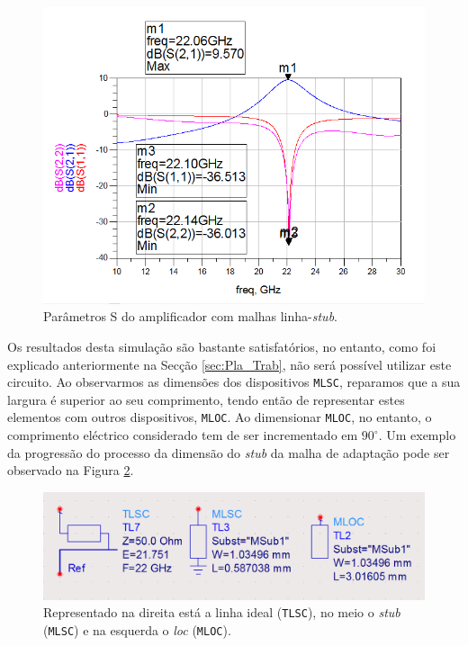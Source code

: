 \documentclass[11pt]{article}
\numberwithin{equation}{section}
\begin{document}
\begin{figure}[H]
	\centering
	\includegraphics[keepaspectratio=true, scale=0.45]{exps/mf_stub_S}
	\vspace{-0.5em}
	\caption{Parâmetros S do amplificador com malhas linha-\textit{stub}.}
	\vspace{-0.8em}
	\label{fig:mf_stub_S}
\end{figure}

Os resultados desta simulação são bastante satisfatórios, no entanto, como foi explicado anteriormente na Secção \ref{sec:Pla_Trab}, não será possível utilizar este circuito. Ao observarmos as dimensões dos dispositivos \texttt{MLSC}, reparamos que a sua largura é superior ao seu comprimento, tendo então de representar estes elementos com outros dispositivos, \texttt{MLOC}. Ao dimensionar \texttt{MLOC}, no entanto, o comprimento eléctrico considerado tem de ser incrementado em $90^{\circ}$. Um exemplo da progressão do processo da dimensão do \textit{stub} da malha de adaptação pode ser observado na Figura \ref{fig:stub_fail}.

\begin{figure}[H]
	\centering
	\includegraphics[keepaspectratio=true, scale=0.3]{exps/stub_fail}
	\vspace{-0.5em}
	\caption{Representado na direita está a linha ideal (\texttt{TLSC}), no meio o \textit{stub} (\texttt{MLSC}) e na esquerda o \textit{loc} (\texttt{MLOC}).}
	\vspace{-0.8em}
	\label{fig:stub_fail}
\end{figure}
\end{document}
